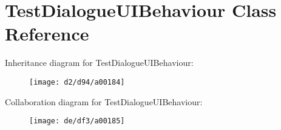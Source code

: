 \hypertarget{a00078}{\section{Test\-Dialogue\-U\-I\-Behaviour Class Reference}
\label{a00078}
}


Inheritance diagram for Test\-Dialogue\-U\-I\-Behaviour\-:
\nopagebreak
\begin{figure}[H]
\begin{center}
\leavevmode
\texttt{[image: d2/d94/a00184]}
\end{center}
\end{figure}


Collaboration diagram for Test\-Dialogue\-U\-I\-Behaviour\-:
\nopagebreak
\begin{figure}[H]
\begin{center}
\leavevmode
\texttt{[image: de/df3/a00185]}
\end{center}
\end{figure}
